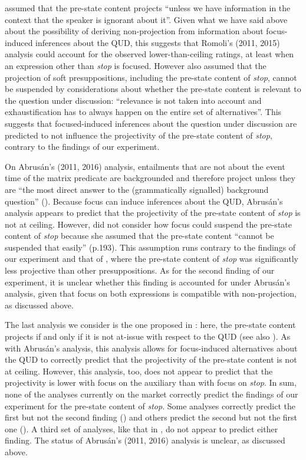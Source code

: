 \documentclass[a4paper,12pt]{article}
\newcommand{\6}{\mbox{$[\hspace*{-.6mm}[$}}
\newcommand{\9}{\mbox{$]\hspace*{-.6mm}]$}}
\begin{document}
\citet[201]{romoli2015} assumed that the pre-state content projects ``unless we have information in the context that the speaker is ignorant about it''. Given what we have said above about the possibility of deriving non-projection from information about focus-induced inferences about the QUD, this suggests that Romoli's (2011, 2015) analysis could account for the observed lower-than-ceiling ratings, at least when an expression other than {\em stop} is focused. However \citet[200]{romoli2015} also assumed that the projection of soft presuppositions, including the pre-state content of {\em stop}, cannot be suspended by considerations about whether the pre-state content is relevant to the question under discussion: ``relevance is not taken into account and exhaustification has to always happen on the entire set of alternatives''. This suggests that focused-induced inferences about the question under discussion are predicted to not influence the projectivity of the pre-state content of {\em stop}, contrary to the findings of our experiment. 

On Abrus\'an's (2011, 2016) analysis, entailments that are not about the event time of the matrix predicate are backgrounded and therefore project unless they are ``the most direct answer to the (grammatically signalled) background question'' (\citealt[511]{abrusan2011}). Because focus can induce inferences about the QUD, Abrus\'an's analysis appears to predict that the projectivity of the pre-state content of {\em stop} is not at ceiling. However, \citet{abrusan2016} did not consider how focus could suspend the pre-state content of {\em stop} because she assumed that the pre-state content ``cannot be suspended that easily'' (p.193). This assumption runs contrary to the findings of our experiment and that of \citealt{tbd-variability}, where the pre-state content of {\em stop} was significantly less projective than other presuppositions. As for the second finding of our experiment, it is unclear whether this finding is accounted for under Abrus\'an's analysis, given that focus on both expressions is compatible with non-projection, as discussed above.

The last analysis we consider is the one proposed in \citealt{brst-ar}: here,  the pre-state content projects if and only if it is not at-issue with respect to the QUD (see also \citealt{brst-salt10,tbd-variability}). As with Abrus\'an's analysis, this analysis allows for focus-induced alternatives about the QUD to correctly predict that the projectivity of the pre-state content is not at ceiling. However, this analysis, too, does not appear to predict that the projectivity is lower with focus on the auxiliary than with focus on {\em stop}. In sum, none of the analyses currently on the market correctly predict the findings of our experiment for the pre-state content of {\em stop}. Some analyses correctly predict the first but not the second finding (\citealt{brst-ar,djaerv-bacovcin-salt27}) and others predict the second but not the first one (\citealt{abusch02,abusch10}). A third set of analyses, like that in \citealt{romoli2011,romoli2015}, do not appear to predict either finding. The status of Abrus\'an's (2011, 2016) analysis is unclear, as discussed above.
\end{document}
